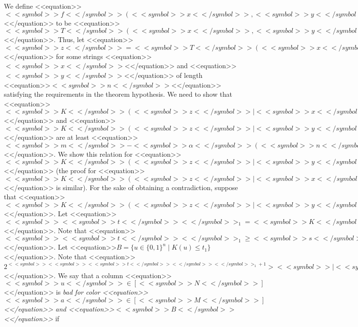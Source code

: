 \documentclass[proceedings]{stacs}
\def\zo{\{0,1\}}
\begin{document}
We define <<equation>>$<<symbol>>f<</symbol>>(<<symbol>>x<</symbol>>,<<symbol>>y<</symbol>>)$<</equation>> to be <<equation>>$<<symbol>>T<</symbol>>(<<symbol>>x<</symbol>>,<<symbol>>y<</symbol>>)$<</equation>>. Thus, let <<equation>>$<<symbol>>z<</symbol>> = <<symbol>>T<</symbol>>(<<symbol>>x<</symbol>>,<<symbol>>y<</symbol>>)$<</equation>> for some strings <<equation>>$<<symbol>>x<</symbol>>$<</equation>> and <<equation>>$<<symbol>>y<</symbol>>$<</equation>> of length <<equation>>$<<symbol>>n<</symbol>>$<</equation>> satisfying the requirements in the theorem hypothesis. We need to show that <<equation>>$<<symbol>>K<</symbol>>(<<symbol>>z<</symbol>> \mid <<symbol>>x<</symbol>>)$<</equation>> and <<equation>>$<<symbol>>K<</symbol>>(<<symbol>>z<</symbol>> \mid <<symbol>>y<</symbol>>)$<</equation>> are at least <<equation>>$<<symbol>>m<</symbol>> - <<symbol>>\alpha<</symbol>>(<<symbol>>n<</symbol>>) - 11 \log <<symbol>>n<</symbol>>$<</equation>>. We show this relation for <<equation>>$<<symbol>>K<</symbol>>(<<symbol>>z<</symbol>> \mid <<symbol>>y<</symbol>>)$<</equation>> (the proof for <<equation>>$<<symbol>>K<</symbol>>(<<symbol>>z<</symbol>> \mid <<symbol>>x<</symbol>>)$<</equation>> is similar). For the sake of obtaining a contradiction, suppose that <<equation>>$<<symbol>>K<</symbol>>(<<symbol>>z<</symbol>> \mid <<symbol>>y<</symbol>>) <  <<symbol>>m<</symbol>> - <<symbol>>\alpha<</symbol>>(<<symbol>>n<</symbol>>) - 11 \log <<symbol>>n<</symbol>> = <<symbol>>m<</symbol>> - <<symbol>>t<</symbol>>$<</equation>>. Let <<equation>>$<<symbol>><<symbol>>t<</symbol>><</symbol>>_1 = <<symbol>>K<</symbol>>(<<symbol>>x<</symbol>>)$<</equation>>. Note that <<equation>>$<<symbol>><<symbol>>t<</symbol>><</symbol>>_1 \geq <<symbol>>s<</symbol>>(<<symbol>>n<</symbol>>)$<</equation>>. Let <<equation>>$B = \{u \in \zo^n \mid K(u) \leq t_1\}$<</equation>>. Note that <<equation>>$2^{<<symbol>><<symbol>><<symbol>>t<</symbol>><</symbol>><</symbol>>_1 + 1} > <<symbol>>|<<symbol>><</symbol>>B<<symbol>><</symbol>>|<</symbol>> \geq 2^{<<symbol>><<symbol>>s<</symbol>>(<<symbol>>n<</symbol>>)<<symbol>>/<</symbol>><</symbol>>2} = <<symbol>>S<</symbol>>$<</equation>>. We say that a column <<equation>>$<<symbol>>u<</symbol>> \in [<<symbol>>N<</symbol>>]$<</equation>> is \emph{bad for color <<equation>>$<<symbol>>a<</symbol>> \in [<<symbol>>M<</symbol>>]$<</equation>> and <<equation>>$<<symbol>>B<</symbol>>$<</equation>>} if
\end{document}
